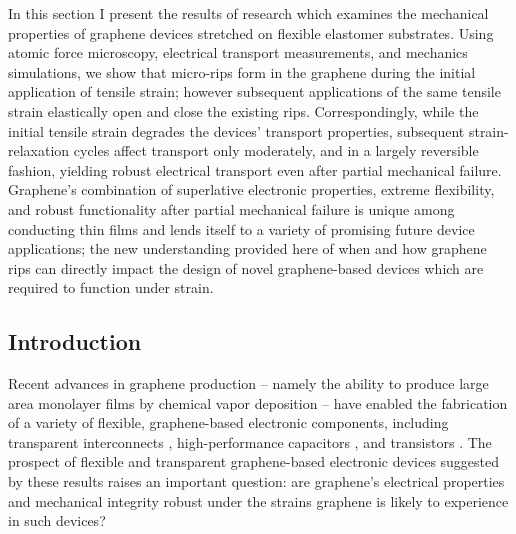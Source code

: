 \documentclass[edeposit,fullpage,draftthesis]{uiucthesis2009}
\begin{document}
    In this section I present the results of research which examines
    the mechanical properties of graphene devices stretched on flexible
    elastomer substrates. Using atomic force microscopy, electrical transport
    measurements, and mechanics simulations, we show that micro-rips form in the
    graphene during the initial application of tensile strain; however subsequent
    applications of the same tensile strain elastically open and close the existing
    rips. Correspondingly, while the initial tensile strain degrades the devices'
    transport properties, subsequent strain-relaxation cycles affect transport only
    moderately, and in a largely reversible fashion, yielding robust electrical
    transport even after partial mechanical failure. Graphene's combination of
    superlative electronic properties, extreme flexibility, and robust
    functionality after partial mechanical failure is unique among conducting thin
    films and lends itself to a variety of promising future device applications;
    the new understanding provided here of when and how graphene rips can directly
    impact the design of novel graphene-based devices which are required to
    function under strain.
    
    \subsection{Introduction}
    
        Recent advances in graphene production \cite{Kim2009, Bae2010, Lee2010} -- namely
        the ability to produce large area monolayer films by chemical vapor deposition -- have
        enabled the fabrication of a variety of flexible, graphene-based electronic
        components, including transparent interconnects \cite{Kim2011}, high-performance
        capacitors \cite{El-Kady2012}, and transistors \cite{Lee2011}. The prospect of
        flexible and transparent graphene-based electronic devices suggested by these
        results raises an important question: are graphene's electrical properties and
        mechanical integrity robust under the strains graphene is likely to experience
        in such devices? 
        
\end{document}
